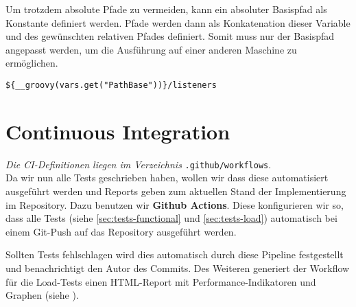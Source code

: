 Um trotzdem absolute Pfade zu vermeiden,
kann ein absoluter Basispfad als Konstante definiert werden.
Pfade werden dann als Konkatenation dieser Variable und des gewünschten relativen Pfades definiert.
Somit muss nur der Basispfad angepasst werden, um die Ausführung auf einer anderen Maschine zu ermöglichen.

\begin{lstlisting}[caption=Workaround zur Angabe relativer Pfade]
    ${__groovy(vars.get("PathBase"))}/listeners
\end{lstlisting}

\section{Continuous Integration}

\textit{Die \ac{CI}-Definitionen liegen im Verzeichnis} \texttt{.github/workflows}.\\

Da wir nun alle Tests geschrieben haben, wollen wir dass diese automatisiert ausgeführt werden und Reports geben zum aktuellen Stand der Implementierung im Repository. Dazu benutzen wir \textbf{Github Actions}. Diese konfigurieren wir so, dass alle Tests (siehe \ref{sec:tests-functional} und \ref{sec:tests-load}) automatisch bei einem Git-Push auf das Repository ausgeführt werden.

Sollten Tests fehlschlagen wird dies automatisch durch diese Pipeline festgestellt und benachrichtigt den Autor des Commits.
Des Weiteren generiert der Workflow für die Load-Tests einen HTML-Report mit Performance-Indikatoren und Graphen (siehe ).
